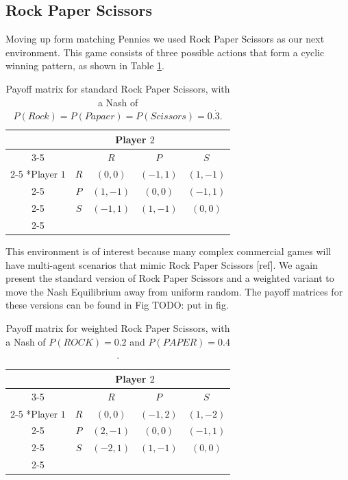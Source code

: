 \documentclass[conference]{IEEEtran}
\newcommand\TODO[1]{{\color{red}TODO: #1}}
\begin{document}
\subsection{Rock Paper Scissors}

Moving up form matching Pennies we used Rock Paper Scissors as our next environment. This game consists of three possible actions that form a cyclic winning pattern, as shown in Table \ref{tab:rps}.

\begin{table}
    \centering
    \setlength{\extrarowheight}{2pt}
    \begin{tabular}{*{5}{c|}}
      \multicolumn{2}{c}{} & \multicolumn{2}{c}{Player $2$}\\\cline{3-5}
      \multicolumn{1}{c}{} &  & $R$  & $P$ & $S$ \\\cline{2-5}
      \multirow{2}*{Player $1$}  & $R$ & $(0,0)$ & $(-1,1)$ & $(1,-1)$ \\\cline{2-5}
      & $P$ & $(1,-1)$ & $(0,0)$ & $(-1,1)$ \\\cline{2-5}
      & $S$ & $(-1,1)$ & $(1,-1)$ & $(0,0)$ \\\cline{2-5}
    \end{tabular}
    \caption{Payoff matrix for standard Rock Paper Scissors, with a Nash of $P(Rock)=P(Papaer)=P(Scissors)=0.\dot{3}$.}
    \label{tab:rps}
\end{table}

This environment is of interest because many complex commercial games will have multi-agent scenarios that mimic Rock Paper Scissors [ref]. We again present the standard version of Rock Paper Scissors and a weighted variant to move the Nash Equilibrium away from uniform random. The payoff matrices for these versions can be found in Fig \TODO{put in fig}.

\begin{table}
    \centering
    \setlength{\extrarowheight}{2pt}
    \begin{tabular}{*{5}{c|}}
      \multicolumn{2}{c}{} & \multicolumn{2}{c}{Player $2$}\\\cline{3-5}
      \multicolumn{1}{c}{} &  & $R$  & $P$ & $S$ \\\cline{2-5}
      \multirow{2}*{Player $1$}  & $R$ & $(0,0)$ & $(-1,2)$ & $(1,-2)$ \\\cline{2-5}
      & $P$ & $(2,-1)$ & $(0,0)$ & $(-1,1)$ \\\cline{2-5}
      & $S$ & $(-2,1)$ & $(1,-1)$ & $(0,0)$ \\\cline{2-5}
    \end{tabular}
    \caption{Payoff matrix for weighted Rock Paper Scissors, with a Nash of $P(ROCK)=0.2$ and $P(PAPER)=0.4$.}
    \label{tab:weighted-rps}
\end{table}
\end{document}
